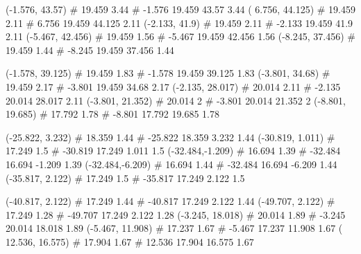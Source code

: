 \documentclass[a4paper,openbib,10pt]{article}
\newenvironment{treegraph}{\begin{graph}}{\end{graph}}
\begin{document}
\begin{treegraph}
  (-1.576, 43.57) #     19.459    3.44
   #    -1.576    19.459    43.57    3.44
  ( 6.756, 44.125) #     19.459    2.11
   #    6.756    19.459    44.125    2.11
  (-2.133, 41.9) #     19.459    2.11
   #    -2.133    19.459    41.9    2.11
  (-5.467, 42.456) #     19.459    1.56
   #    -5.467    19.459    42.456    1.56
  (-8.245, 37.456) #     19.459    1.44
   #    -8.245    19.459    37.456    1.44

  (-1.578, 39.125) #     19.459    1.83
   #    -1.578    19.459    39.125    1.83
  (-3.801, 34.68) #     19.459    2.17
   #    -3.801    19.459    34.68    2.17
  (-2.135, 28.017) #     20.014    2.11
   #    -2.135    20.014    28.017    2.11
  (-3.801, 21.352) #     20.014    2
   #    -3.801    20.014    21.352    2
  (-8.801, 19.685) #     17.792    1.78
   #    -8.801    17.792    19.685    1.78

  (-25.822, 3.232) #     18.359    1.44
   #    -25.822    18.359    3.232    1.44
  (-30.819, 1.011) #     17.249    1.5
   #    -30.819    17.249    1.011    1.5
  (-32.484,-1.209) #     16.694    1.39
   #    -32.484    16.694    -1.209    1.39
  (-32.484,-6.209) #     16.694    1.44
   #    -32.484    16.694    -6.209    1.44
  (-35.817, 2.122) #     17.249    1.5
   #    -35.817    17.249    2.122    1.5

  (-40.817, 2.122) #     17.249    1.44
   #    -40.817    17.249    2.122    1.44
  (-49.707, 2.122) #     17.249    1.28
   #    -49.707    17.249    2.122    1.28
  (-3.245, 18.018) #     20.014    1.89
   #    -3.245    20.014    18.018    1.89
  (-5.467, 11.908) #     17.237    1.67
   #    -5.467    17.237    11.908    1.67
  ( 12.536, 16.575) #     17.904    1.67
   #    12.536    17.904    16.575    1.67


\end{treegraph}
\end{document}
